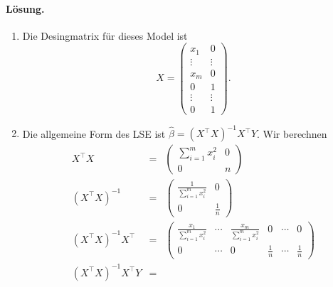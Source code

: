 \paragraph*{Lösung.}
\begin{enumerate}
    \item Die Desingmatrix für dieses Model ist
            \begin{equation}
                X = \left(
                \begin{array}{cc}
                    x_1 & 0 \\
                    \vdots & \vdots \\
                    x_m & 0 \\
                    0 & 1 \\
                    \vdots & \vdots \\
                    0 & 1 
                \end{array}
                \right).
            \end{equation}
        \item Die allgemeine Form des LSE ist 
            $\hat \beta = \left( X^\top X \right)^{-1} X^\top Y$. Wir berechnen
            \begin{eqnarray}
                X^\top X &=& \left(
                \begin{array}{cc}
                    \sum_{i=1}^{m} x_i^2 & 0 \\
                    0 & n 
                \end{array}
                \right) \\
                \left( X^\top X \right)^{-1} &=& \left(
                \begin{array}{cc}
                    \frac{1}{\sum_{i=1}^{m} x_i^2} & 0 \\
                    0 & \frac{1}{n} 
                \end{array}
                \right) \\
                \left( X^\top X \right)^{-1} X^\top &=& \left(
                \begin{array}{cccccc}
                    \frac{x_1}{\sum_{i=1}^{m} x_i^2} & \cdots & \frac{x_m}{\sum_{i=1}^{m} x_i^2} & 
                        0 & \cdots & 0 \\
                        0& \cdots &0& \frac{1}{n} & \cdots & \frac{1}{n} 
                \end{array}
                \right) \\
                \left( X^\top X \right)^{-1} X^\top Y &=& 

\end{eqnarray}
\end{enumerate}
